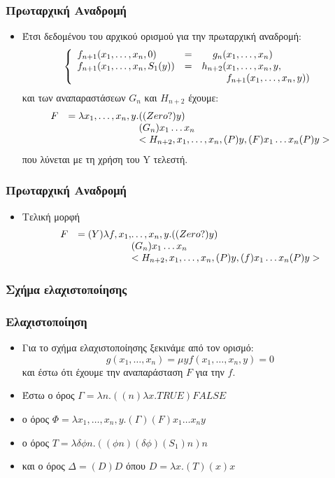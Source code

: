 \documentclass{beamer}
\begin{document}
\begin{frame}
  \frametitle{Πρωταρχική Αναδρομή}
  \begin{itemize}
  \item Έτσι δεδομένου του αρχικού ορισμού για την πρωταρχική αναδρομή:
    $$\left\{
    \begin{array}{llr@{}l}
      f_{n+1}(x_1,\ldots,x_n, 0)     &=&    g_n(&x_1,\ldots,x_n) \\
      f_{n+1}(x_1,\ldots,x_n, S_1(y))&=&h_{n+2}(&x_1,\ldots,x_n, y ,\\
      & &        &f_{n+1}(x_1,\ldots,x_n, y))
    \end{array}
    \right.$$
    και των αναπαραστάσεων $G_n$ και $H_{n+2}$
    \pause
    έχουμε:
    $$
    \begin{array}{lr@{}l}
      F &= \lambda x_1,\ldots ,x_n, y .&((Zero?)y) \\
      & &(G_n)x_1 \ldots x_n \\
      & &<H_{n+2},x_1,\ldots,x_n,(P)y,(F)x_1 \ldots x_n (P)y>
    \end{array}
    $$
    \pause
    που λύνεται με τη χρήση του Y τελεστή.
  \end{itemize}
\end{frame}

\begin{frame}
  \frametitle{Πρωταρχική Αναδρομή}
  \begin{itemize}
  \item Τελική μορφή
    $$
    \begin{array}{lr@{}l}
    F &= (Y)\lambda f,x_1,&\ldots ,x_n, y .((Zero?)y) \\
    & &(G_n)x_1 \ldots x_n \\
    & &<H_{n+2},x_1,\ldots,x_n,(P)y,(f)x_1 \ldots x_n (P)y>
    \end{array}
    $$
  \end{itemize}
\end{frame}

\subsubsection{Σχήμα ελαχιστοποίησης}

\begin{frame}
  \frametitle{Ελαχιστοποίηση}
  \begin{itemize}
  \item Για το σχήμα ελαχιστοποίησης ξεκινάμε από τον ορισμό:
    $$g(x_1,\ldots,x_n) = \mu y {f(x_1,\ldots,x_n,y)=0}$$ και έστω ότι
    έχουμε την αναπαράσταση $F$ για την $f$.  \pause
  \item Έστω ο όρος $\Gamma = \lambda n. ((n) \lambda x. TRUE) FALSE$
    \pause
  \item ο όρος $\Phi = \lambda x_1,\ldots,x_n,y . (\Gamma) (F) x_1
    \ldots x_n y$ \pause
  \item ο όρος $ T = \lambda \delta \phi n . ((\phi n)(\delta \phi)
    (S_1) n) n$ \pause
  \item και ο όρος $\Delta = (D)D$ όπου $D = \lambda x . (T) (x) x$
  \end{itemize}
\end{frame}
\end{document}
